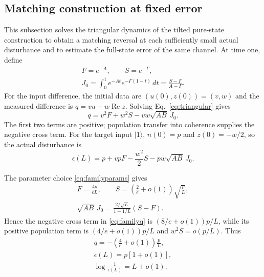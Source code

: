 \documentclass[aps,pra,reprint,amsmath,amssymb,nofootinbib,floatfix,longbibliography]{revtex4-2}
\theoremstyle{aps}
\newcommand{\eps}{\epsilon}
\newcommand{\ket}[1]{|#1\rangle}
\begin{document}
\subsection{Matching construction at fixed error}\label{app:unrestricted-sharpness}\label{sec:sharpness}

This subsection solves the triangular dynamics of the tilted pure-state construction to obtain a matching reversal at each sufficiently small actual disturbance and to estimate the full-state error of the same channel. At time one, define
\begin{equation}\label{eq:familykernels}
 \begin{gathered}
 F=e^{-A},\qquad S=e^{-\Gamma},\\
 J_0=\int_0^1e^{-At}e^{-\Gamma(1-t)}\,dt
 =\frac{S-F}{A-\Gamma}.
 \end{gathered}
\end{equation}
For the input difference, the initial data are $(u(0),z(0))=(v,w)$ and the measured difference is $q=vu+w\operatorname{Re}z$. Solving Eq.~\eqref{eq:triangular} gives
\begin{equation}\label{eq:familyq}
 q=v^2F+w^2S-vw\sqrt{AB}\,J_0.
\end{equation}
The first two terms are positive; population transfer into coherence supplies the negative cross term. For the target input $\ket1$, $n(0)=p$ and $z(0)=-w/2$, so the actual disturbance is
\begin{equation}\label{eq:actualepsilon}
 \eps(L)=p+vpF-\frac{w^2}{2}S-pw\sqrt{AB}\,J_0.
\end{equation}

The parameter choice \eqref{eq:familyparams} gives
\begin{equation}\label{eq:familyasymptotics}
 \begin{gathered}
 F=\frac{4p}{eL},\qquad
 S=\left(\frac2e+o(1)\right)\sqrt{\frac pL},\\
 \sqrt{AB}\,J_0=\frac{2/\sqrt L}{1-1/L}(S-F).
 \end{gathered}
\end{equation}
Hence the negative cross term in \eqref{eq:familyq} is
$(8/e+o(1))p/L$, while its positive population term is
$(4/e+o(1))p/L$ and $w^2S=o(p/L)$. Thus
\begin{equation}\label{eq:familylimit}
 \begin{gathered}
 q=-\left(\frac4e+o(1)\right)\frac pL,
 \\ \eps(L)=p[1+o(1)],
 \\ \log\frac1{\eps(L)}=L+o(1).
 \end{gathered}
\end{equation}
\end{document}
